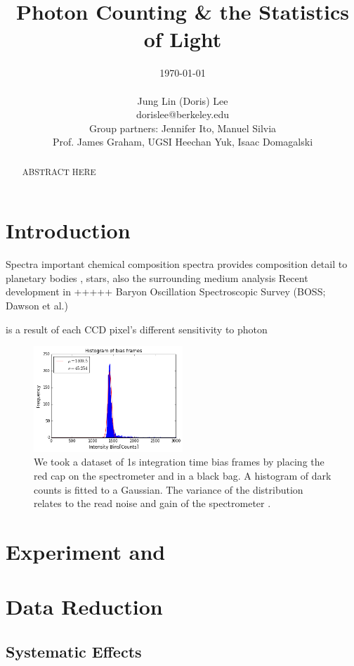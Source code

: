 \documentclass[authoryear, 12pt,5p, times]{elsarticle}
\begin{document}
\begin{frontmatter}
\title{Photon Counting \& the Statistics of Light}
\author{\today \\ \quad \\Jung Lin (Doris) Lee\\ dorislee@berkeley.edu\\Group partners: Jennifer Ito, Manuel Silvia\\Prof. James Graham, UGSI Heechan Yuk, Isaac Domagalski}
	\begin{abstract}
	ABSTRACT HERE
	\end{abstract}
\end{frontmatter}
\section{Introduction\label{intro}}
Spectra important chemical composition 
spectra provides composition detail to planetary bodies , stars, also the surrounding medium 
analysis
Recent development in +++++ Baryon Oscillation Spectroscopic Survey (BOSS; Dawson et al.)

is a result of each CCD pixel's different sensitivity to photon
\begin{figure}
\includegraphics[width=0.5\textwidth]{figures/bias_histo}
\caption{We took a dataset of 1s integration time bias frames by placing the red cap on the spectrometer and in a black bag. A histogram of dark counts is fitted to a Gaussian. The variance of the distribution relates to the read noise and gain of the spectrometer \citep{ccd_handbook}.}
\end{figure}
\section{Experiment and }
\section{Data Reduction}
	\subsection{Systematic Effects}
\end{document}
